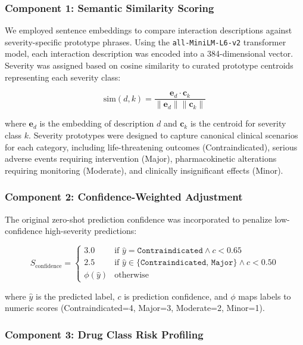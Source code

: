 \documentclass[11pt,a4paper]{article}
\begin{document}
\subsubsection*{Component 1: Semantic Similarity Scoring}

We employed sentence embeddings to compare interaction descriptions against severity-specific prototype phrases. Using the \texttt{all-MiniLM-L6-v2} transformer model, each interaction description was encoded into a 384-dimensional vector. Severity was assigned based on cosine similarity to curated prototype centroids representing each severity class:

\begin{equation}
\text{sim}(d, k) = \frac{\mathbf{e}_d \cdot \mathbf{c}_k}{\|\mathbf{e}_d\| \|\mathbf{c}_k\|}
\end{equation}

where $\mathbf{e}_d$ is the embedding of description $d$ and $\mathbf{c}_k$ is the centroid for severity class $k$. Severity prototypes were designed to capture canonical clinical scenarios for each category, including life-threatening outcomes (Contraindicated), serious adverse events requiring intervention (Major), pharmacokinetic alterations requiring monitoring (Moderate), and clinically insignificant effects (Minor).

\subsubsection*{Component 2: Confidence-Weighted Adjustment}

The original zero-shot prediction confidence was incorporated to penalize low-confidence high-severity predictions:

\begin{equation}
S_{\text{confidence}} = 
\begin{cases}
3.0 & \text{if } \hat{y} = \texttt{Contraindicated} \land c < 0.65 \\
2.5 & \text{if } \hat{y} \in \{\texttt{Contraindicated, Major}\} \land c < 0.50 \\
\phi(\hat{y}) & \text{otherwise}
\end{cases}
\end{equation}

where $\hat{y}$ is the predicted label, $c$ is prediction confidence, and $\phi$ maps labels to numeric scores (Contraindicated=4, Major=3, Moderate=2, Minor=1).

\subsubsection*{Component 3: Drug Class Risk Profiling}
\end{document}
